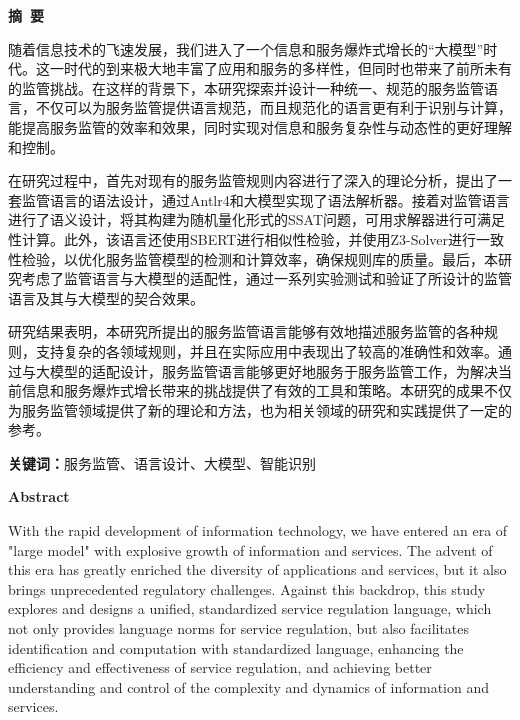\cleardoublepage{}
\begin{center}
    \bfseries {} 摘~要
\end{center}

随着信息技术的飞速发展，我们进入了一个信息和服务爆炸式增长的“大模型”时代。这一时代的到来极大地丰富了应用和服务的多样性，但同时也带来了前所未有的监管挑战。在这样的背景下，本研究探索并设计一种统一、规范的服务监管语言，不仅可以为服务监管提供语言规范，而且规范化的语言更有利于识别与计算，能提高服务监管的效率和效果，同时实现对信息和服务复杂性与动态性的更好理解和控制。

在研究过程中，首先对现有的服务监管规则内容进行了深入的理论分析，提出了一套监管语言的语法设计，通过Antlr4和大模型实现了语法解析器。接着对监管语言进行了语义设计，将其构建为随机量化形式的SSAT问题，可用求解器进行可满足性计算。此外，该语言还使用SBERT进行相似性检验，并使用Z3-Solver进行一致性检验，以优化服务监管模型的检测和计算效率，确保规则库的质量。最后，本研究考虑了监管语言与大模型的适配性，通过一系列实验测试和验证了所设计的监管语言及其与大模型的契合效果。

研究结果表明，本研究所提出的服务监管语言能够有效地描述服务监管的各种规则，支持复杂的各领域规则，并且在实际应用中表现出了较高的准确性和效率。通过与大模型的适配设计，服务监管语言能够更好地服务于服务监管工作，为解决当前信息和服务爆炸式增长带来的挑战提供了有效的工具和策略。本研究的成果不仅为服务监管领域提供了新的理论和方法，也为相关领域的研究和实践提供了一定的参考。

\vspace{1\baselineskip}
\noindent \textbf{关键词：}服务监管、语言设计、大模型、智能识别

\cleardoublepage{}
\begin{center}
    \bfseries {} Abstract
\end{center}

With the rapid development of information technology, we have entered an era of "large model" with explosive growth of information and services. The advent of this era has greatly enriched the diversity of applications and services, but it also brings unprecedented regulatory challenges. Against this backdrop, this study explores and designs a unified, standardized service regulation language, which not only provides language norms for service regulation, but also facilitates identification and computation with standardized language, enhancing the efficiency and effectiveness of service regulation, and achieving better understanding and control of the complexity and dynamics of information and services.

